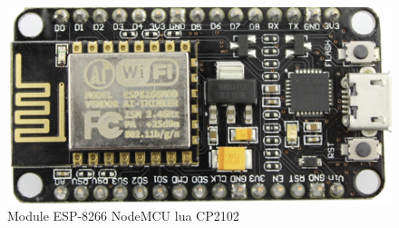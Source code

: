         \begin{figure}[!ht]
            \begin{center}
            \includegraphics[scale=0.9]{images/module-esp.png}
            \caption{Module ESP-8266 NodeMCU lua CP2102}
            \label{fig:moduleEsp}
            \end{center}
          \end{figure}


